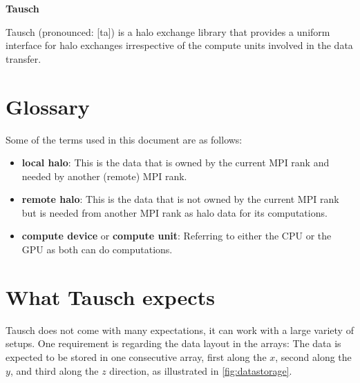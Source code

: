 \documentclass{article}
\begin{document}

\begin{center}\Huge\bfseries
    Tausch
\end{center}

\vspace{4mm}


Tausch (pronounced: [ta\textupsilon\textesh]) is a halo exchange library that provides a uniform interface for halo exchanges irrespective of the compute units involved in the data transfer.

\section{Glossary}

Some of the terms used in this document are as follows:
\begin{itemize}
    \item \textbf{local halo}: This is the data that is owned by the current MPI rank and needed by another (remote) MPI rank.
    \item \textbf{remote halo}: This is the data that is not owned by the current MPI rank but is needed from another MPI rank as halo data for its computations.
    \item \textbf{compute device} or \textbf{compute unit}: Referring to either the CPU or the GPU as both can do computations.
\end{itemize}

\section{What Tausch expects}

Tausch does not come with many expectations, it can work with a large variety of setups. One requirement is regarding the data layout in the arrays: The data is expected to be stored in one consecutive array, first along the $x$, second along the $y$, and third along the $z$ direction, as illustrated in \autoref{fig:datastorage}.
\end{document}
